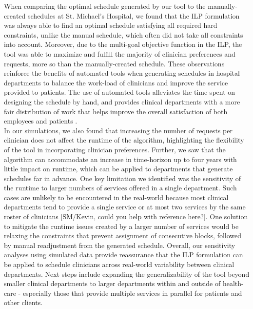 When comparing the optimal schedule generated by our tool to the manually-created schedules at St. Michael's Hospital, we found that the ILP formulation was always able to find an optimal schedule satisfying all required hard constraints, unlike the manual schedule, which often did not take all constraints into account. Moreover, due to the multi-goal objective function in the ILP, the tool was able to maximize and fulfill the majority of clinician preferences and requests, more so than the manually-created schedule. These observations reinforce the benefits of automated tools when generating schedules in hospital departments to balance the work-load of clinicians and improve the service provided to patients. The use of automated tools alleviates the time spent on designing the schedule by hand, and provides clinical departments with a more fair distribution of work that helps improve the overall satisfaction of both employees and patients \cite{silvestro_evaluation_2000}. \\  %

In our simulations, we also found that increasing the number of requests per clinician does not affect the runtime of the algorithm, highlighting the flexibility of the tool in incorporating clinician preferences. Further, we saw that the algorithm can accommodate an increase in time-horizon up to four years with little impact on runtime, which can be applied to departments that generate schedules far in advance. One key limitation we identified was the sensitivity of the runtime to larger numbers of services offered in a single department. Such cases are unlikely to be encountered in the real-world because most clinical departments tend to provide a single service or at most two services by the same roster of clinicians [{\color{red}SM/Kevin, could you help with reference here?}]. One solution to mitigate the runtime issues created by a larger number of services would be relaxing the constraints that prevent assignment of consecutive blocks, followed by manual readjustment from the generated schedule. %
Overall, our sensitivity analyses using simulated data provide reassurance that the ILP formulation can be applied to schedule clinicians across real-world variability between clinical departments. %
Next steps include expanding the generalizability of the tool beyond smaller clinical departments to larger departments within and outside of health-care - especially those that provide multiple services in parallel for patients and other clients. 
